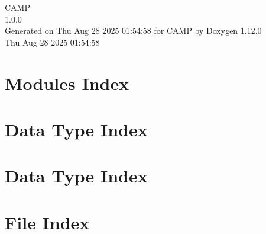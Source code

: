 \documentclass[twoside]{book}
\newcommand{\+}{\discretionary{\mbox{\scriptsize$\hookleftarrow$}}{}{}}
\newcommand{\clearemptydoublepage}{%
    \newpage{\pagestyle{empty}\cleardoublepage}%
  }
\begin{document}
  \raggedbottom
    \hypersetup{pageanchor=false,
                bookmarksnumbered=true,
                pdfencoding=unicode
               }
  \begin{titlepage}
  \vspace*{7cm}
  \begin{center}%
  {\Large CAMP}\\
  [1ex]\large 1.\+0.\+0 \\
  \vspace*{1cm}
  {\large Generated on Thu Aug 28 2025 01\+:54\+:58 for CAMP by Doxygen 1.12.0}\\
    \vspace*{0.5cm}
    {\small Thu Aug 28 2025 01:54:58}
  \end{center}
  \end{titlepage}
  \clearemptydoublepage
  \tableofcontents
  \clearemptydoublepage
  \hypersetup{pageanchor=true}















\chapter{Modules Index}

\chapter{Data Type Index}

\chapter{Data Type Index}

\chapter{File Index}

\end{document}
